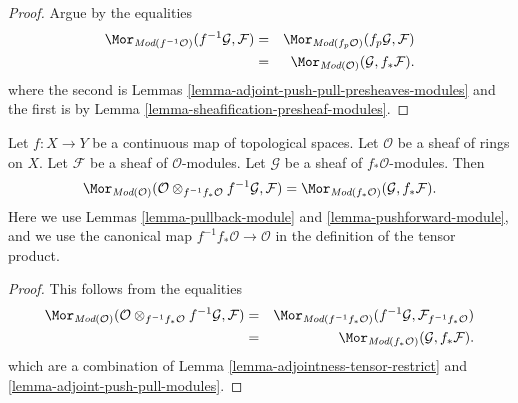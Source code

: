 \begin{proof}
Argue by the equalities
\begin{eqnarray*}
\Mor_{\textit{Mod}(f^{-1}\mathcal{O})}(f^{-1}\mathcal{G}, \mathcal{F})
& = &
\Mor_{\textit{Mod}(f_p\mathcal{O})}(f_p\mathcal{G}, \mathcal{F}) \\
& = &
\Mor_{\textit{Mod}(\mathcal{O})}(\mathcal{G}, f_*\mathcal{F}).
\end{eqnarray*}
where the second is
Lemmas \ref{lemma-adjoint-push-pull-presheaves-modules}
and the first is by Lemma \ref{lemma-sheafification-presheaf-modules}.
\end{proof}

\begin{lemma}
\label{lemma-adjoint-pull-push-modules}
Let $f : X \to Y$ be a continuous map of topological spaces.
Let $\mathcal{O}$ be a sheaf of rings on $X$.
Let $\mathcal{F}$ be a sheaf of $\mathcal{O}$-modules.
Let $\mathcal{G}$ be a sheaf of $f_*\mathcal{O}$-modules.
Then
$$
\Mor_{\textit{Mod}(\mathcal{O})}(
\mathcal{O} \otimes_{f^{-1}f_*\mathcal{O}} f^{-1}\mathcal{G}, \mathcal{F})
=
\Mor_{\textit{Mod}(f_*\mathcal{O})}(\mathcal{G}, f_*\mathcal{F}).
$$
Here we use
Lemmas \ref{lemma-pullback-module}
and \ref{lemma-pushforward-module}, and we use
the canonical map $f^{-1}f_*\mathcal{O} \to \mathcal{O}$
in the definition of the tensor product.
\end{lemma}

\begin{proof}
This follows from the equalities
\begin{eqnarray*}
\Mor_{\textit{Mod}(\mathcal{O})}(
\mathcal{O} \otimes_{f^{-1}f_*\mathcal{O}} f^{-1}\mathcal{G}, \mathcal{F})
& = &
\Mor_{\textit{Mod}(f^{-1}f_*\mathcal{O})}(
f^{-1}\mathcal{G}, \mathcal{F}_{f^{-1}f_*\mathcal{O}}) \\
& = &
\Mor_{\textit{Mod}(f_*\mathcal{O})}(\mathcal{G}, f_*\mathcal{F}).
\end{eqnarray*}
which are a combination of
Lemma \ref{lemma-adjointness-tensor-restrict}
and \ref{lemma-adjoint-push-pull-modules}.
\end{proof}

